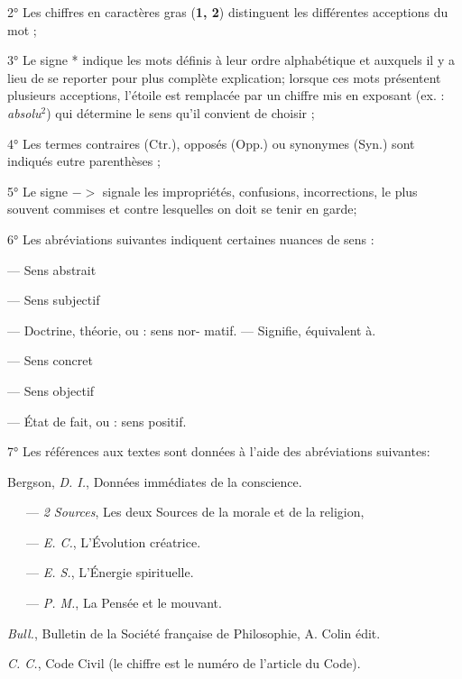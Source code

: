 \vspace{0.211cm}
2° Les chiffres en caractères gras ({\bf 1, 2}) distinguent les différentes acceptions
du mot ;

3° Le signe * indique les mots définis à leur ordre alphabétique et auxquels
il y a lieu de se reporter pour plus complète explication; lorsque ces mots présentent plusieurs acceptions, l'étoile est remplacée par un chiffre mis en exposant (ex. : {\it absolu}$^2$) qui détermine le sens qu'il convient de choisir ;

4° Les termes contraires (Ctr.), opposés (Opp.) ou synonymes (Syn.) sont
indiqués eutre parenthèses ;

5° Le signe $->$
signale les impropriétés, confusions, incorrections, le plus
souvent commises et contre lesquelles on doit se tenir en garde;

6° Les abréviations suivantes indiquent certaines nuances de sens :

\hfill
\begin{minipage}[c]{.45\linewidth}
 — Sens abstrait

 — Sens subjectif

 — Doctrine, théorie, ou : sens nor-   
matif. — Signifie, équivalent à.
\end{minipage}
\hfill
\begin{minipage}[c]{.45\linewidth}
 — Sens concret

 — Sens objectif

 — État de fait, ou : sens positif.
\end{minipage}

\vspace{0.211cm}

7° Les références aux textes sont données à l’aide des abréviations suivantes:

Bergson, {\it D. I.}, Données immédiates de la conscience.

\ \ \ — {\it 2 Sources}, Les deux Sources de la morale et de la religion,

\ \ \ — {\it E. C.}, L'Évolution créatrice.

\ \ \ — {\it E. S.}, L'Énergie spirituelle.

\ \ \ — {\it P. M.}, La Pensée et le mouvant.

{\it Bull.}, Bulletin de la Société française de Philosophie, A. Colin édit.

{\it C. C.}, Code Civil (le chiffre est le numéro de l’article du Code).

